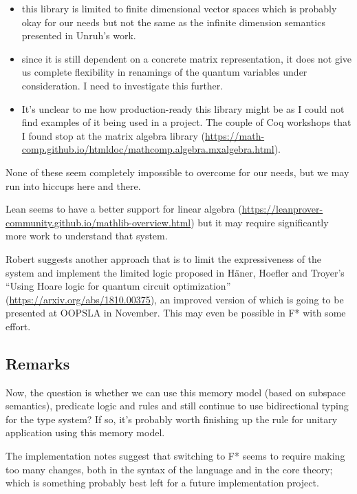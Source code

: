 \documentclass[acmsmall,nonacm,timestamp,review=false,anonymous=false]{acmart}
\begin{document}
\begin{itemize}
	\item this library is limited to finite dimensional vector spaces which is probably okay for our needs but not the same as the infinite dimension semantics presented in Unruh's work.
	\item since it is still dependent on a concrete matrix representation, it does not give us complete flexibility in renamings of the quantum variables under consideration. I need to investigate this further.
	\item It's unclear to me how production-ready this library might be as I could not find examples of it being used in a project. The couple of Coq workshops that I found stop at the matrix algebra library (\url{https://math-comp.github.io/htmldoc/mathcomp.algebra.mxalgebra.html}).
\end{itemize}

None of these seem completely impossible to overcome for our needs, but we may run into hiccups here and there.

Lean seems to have a better support for linear algebra (\url{https://leanprover-community.github.io/mathlib-overview.html}) but it may require significantly more work to understand that system.

Robert suggests another approach that is to limit the expressiveness of the system and implement the limited logic proposed in Häner, Hoefler and Troyer's ``Using Hoare logic for quantum circuit optimization'' (\url{https://arxiv.org/abs/1810.00375}), an improved version of which is going to be presented at OOPSLA in November. This may even be possible in F* with some effort.

\subsection{Remarks}
Now, the question is whether we can use this memory model (based on subspace semantics), predicate logic and rules and still continue to use bidirectional typing for the type system? If so, it's probably worth finishing up the rule for unitary application using this memory model.

The implementation notes suggest that switching to F* seems to require making too many changes, both in the syntax of the language and in the core theory; which is something probably best left for a future implementation project.

\end{document}

